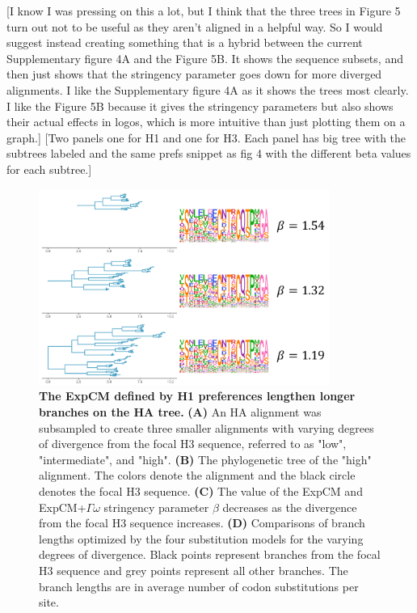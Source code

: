 \documentclass[11pt]{article}
\newcommand\skhcomment[1]{{\color{cyan}[#1]}}
\begin{document}
\skhcomment{I know I was pressing on this a lot, but I think that the three trees in Figure 5 turn out not to be useful as they aren't aligned in a helpful way. So I would suggest instead creating something that is a hybrid between the current Supplementary figure 4A and the Figure 5B. It shows the sequence subsets, and then just shows that the stringency parameter goes down for more diverged alignments. I like the Supplementary figure 4A as it shows the trees most clearly. I like the Figure 5B because it gives the stringency parameters but also shows their actual effects in logos, which is more intuitive than just plotting them on a graph.}
\skhcomment{Two panels one for H1 and one for H3. Each panel has big tree with the subtrees labeled and the same prefs snippet as fig 4 with the different beta values for each subtree.}

\begin{figure}[H]
\centerline{\includegraphics[width=0.85\textwidth]{figures/doud_compete_2}}
\caption{\label{fig:doud_compete}
\textbf{The ExpCM defined by H1 preferences lengthen longer branches on the HA tree.} 
\textbf{(A)} An HA alignment was subsampled to create three smaller alignments with varying degrees of divergence from the focal H3 sequence, referred to as "low", "intermediate", and "high". 
\textbf{(B)} The phylogenetic tree of the "high" alignment. 
The colors denote the alignment and the black circle denotes the focal H3 sequence. 
\textbf{(C)} The value of the ExpCM and ExpCM+$\Gamma\omega$ stringency parameter $\beta$ decreases as the divergence from the focal H3 sequence increases. 
\textbf{(D)} Comparisons of branch lengths optimized by the four substitution models for the varying degrees of divergence. 
Black points represent branches from the focal H3 sequence and grey points represent all other branches.  
The branch lengths are in average number of codon substitutions per site. 
}
\end{figure}
\end{document}
